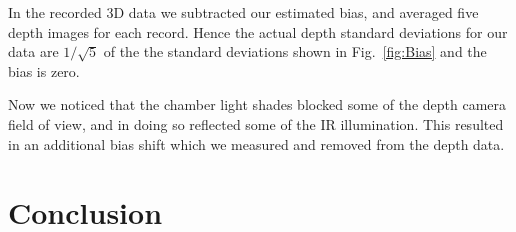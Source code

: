 In the recorded 3D data we subtracted our estimated bias, and averaged five depth images for each record.  Hence the actual depth standard deviations for our data are $1/\sqrt{5}$ of the the standard deviations shown in Fig.~\ref{fig:Bias} and the bias is zero.

Now we noticed that the chamber light shades blocked some of the depth camera field of view, and in doing so reflected some of the IR illumination.  This resulted in an additional bias shift which we measured and removed from the depth data.












\section{Conclusion}

